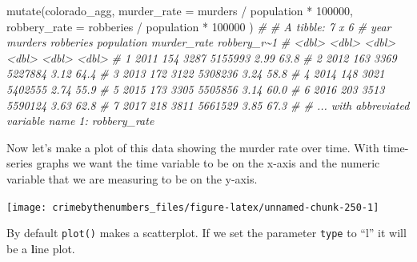 \documentclass[
  a4paper,
]{krantz}
\makeatletter
\newenvironment{Shaded}{\begin{snugshade}}{\end{snugshade}}
\newcommand{\AttributeTok}[1]{\textcolor[rgb]{0.61,0.61,0.61}{#1}}
\newcommand{\CommentTok}[1]{\textcolor[rgb]{0.37,0.37,0.37}{\textit{#1}}}
\newcommand{\DecValTok}[1]{\textcolor[rgb]{0.06,0.06,0.06}{#1}}
\newcommand{\FunctionTok}[1]{\textcolor[rgb]{0,0,0}{#1}}
\newcommand{\NormalTok}[1]{#1}
\newcommand{\SpecialCharTok}[1]{\textcolor[rgb]{0,0,0}{#1}}
\newenvironment{kframe}{%
\medskip{}
\setlength{\fboxsep}{.8em}
 \def\at@end@of@kframe{}%
 \ifinner\ifhmode%
  \def\at@end@of@kframe{\end{minipage}}%
  \begin{minipage}{\columnwidth}%
 \fi\fi%
 \def\FrameCommand##1{\hskip\@totalleftmargin \hskip-\fboxsep
 \colorbox{shadecolor}{##1}\hskip-\fboxsep
     \hskip-\linewidth \hskip-\@totalleftmargin \hskip\columnwidth}%
 \MakeFramed {\advance\hsize-\width
   \@totalleftmargin\z@ \linewidth\hsize
   \@setminipage}}%
 {\par\unskip\endMakeFramed%
 \at@end@of@kframe}
\renewenvironment{Shaded}{\begin{kframe}}{\end{kframe}}
\makeatother
\begin{document}
\begin{Shaded}
\begin{Highlighting}[]
\FunctionTok{mutate}\NormalTok{(colorado\_agg,}
  \AttributeTok{murder\_rate  =}\NormalTok{ murders }\SpecialCharTok{/}\NormalTok{ population }\SpecialCharTok{*} \DecValTok{100000}\NormalTok{,}
  \AttributeTok{robbery\_rate =}\NormalTok{ robberies }\SpecialCharTok{/}\NormalTok{ population }\SpecialCharTok{*} \DecValTok{100000}
\NormalTok{)}
\CommentTok{\# \# A tibble: 7 x 6}
\CommentTok{\#    year murders robberies population murder\_rate robbery\_r\textasciitilde{}1}
\CommentTok{\#   \textless{}dbl\textgreater{}   \textless{}dbl\textgreater{}     \textless{}dbl\textgreater{}      \textless{}dbl\textgreater{}       \textless{}dbl\textgreater{}       \textless{}dbl\textgreater{}}
\CommentTok{\# 1  2011     154      3287    5155993        2.99        63.8}
\CommentTok{\# 2  2012     163      3369    5227884        3.12        64.4}
\CommentTok{\# 3  2013     172      3122    5308236        3.24        58.8}
\CommentTok{\# 4  2014     148      3021    5402555        2.74        55.9}
\CommentTok{\# 5  2015     173      3305    5505856        3.14        60.0}
\CommentTok{\# 6  2016     203      3513    5590124        3.63        62.8}
\CommentTok{\# 7  2017     218      3811    5661529        3.85        67.3}
\CommentTok{\# \# ... with abbreviated variable name 1: robbery\_rate}
\end{Highlighting}
\end{Shaded}

Now let's make a plot of this data showing the murder rate
over time. With time-series graphs we want the time variable
to be on the x-axis and the numeric variable that we are
measuring to be on the y-axis.

\begin{Shaded}
\end{Shaded}

\begin{center}\texttt{[image: crimebythenumbers\_files/figure-latex/unnamed-chunk-250-1]} \end{center}

By default \texttt{plot()} makes a scatterplot. If we set
the parameter \texttt{type} to ``l'' it will be a
\textbf{l}ine plot.
\end{document}
